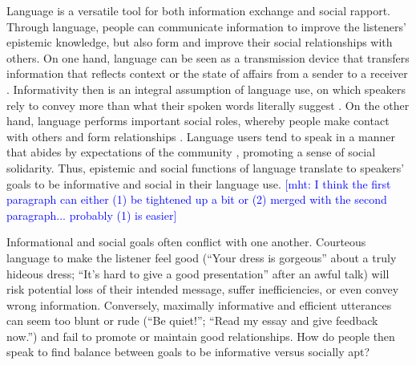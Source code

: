 \documentclass[12pt]{article}
\newcommand{\mht}[1]{\textcolor{Blue}{[mht: #1]}}
\begin{document}
Language is a versatile tool for both information exchange and social rapport. 
Through language, people can communicate information to improve the listeners' epistemic knowledge, 
but also form and improve their social relationships with others.
On one hand, language can be seen as a transmission device that transfers information 
that reflects context or the state of affairs from a sender to a receiver \cite{buhler1934, shannon1948, jakobson1960}.
Informativity then is an integral assumption of language use, 
on which speakers rely to convey more than what their spoken words literally suggest \cite{grice1975, searle1975}.
On the other hand, language performs important social roles, 
whereby people make contact with others and form relationships \cite{halliday1975, ervin1967}. 
Language users tend to speak in a manner that abides by expectations of the community \cite{ervin1969}, 
promoting a sense of social solidarity. 
Thus, epistemic and social functions of language translate to speakers' goals to be informative and social in their language use.
\mht{I think the first paragraph can either (1) be tightened up a bit or (2) merged with the second paragraph... probably (1) is easier}
 
Informational and social goals often conflict with one another.
Courteous language to make the listener feel good 
(\enquote{Your dress is gorgeous} about a truly hideous dress; 
\enquote{It's hard to give a good presentation} after an awful talk) 
will risk potential loss of their intended message, suffer inefficiencies, or even convey wrong information. 
Conversely, maximally informative and efficient utterances can seem too blunt or rude 
(\enquote{Be quiet!}; \enquote{Read my essay and give feedback now.}) 
and fail to promote or maintain good relationships.
How do people then speak to find balance between goals to be informative versus socially apt?
\end{document}
